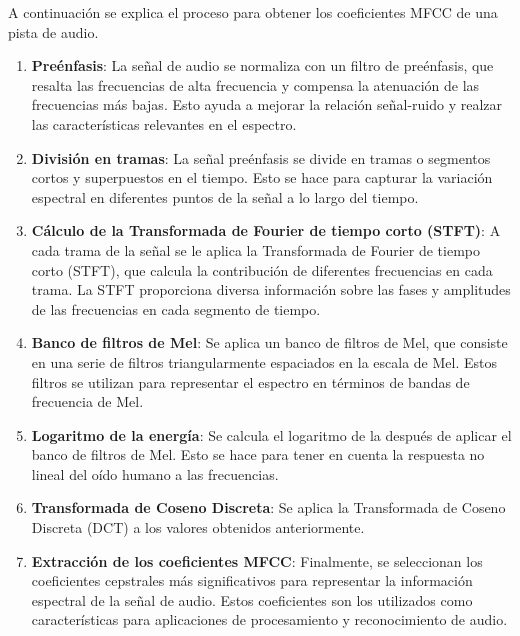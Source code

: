 A continuación se explica el proceso para obtener los coeficientes MFCC de una pista de audio.

\begin{enumerate}
\tightlist
\item \textbf{Preénfasis}: La señal de audio se normaliza con un filtro de preénfasis, que resalta las frecuencias de alta frecuencia y compensa la atenuación de las frecuencias más bajas. Esto ayuda a mejorar la relación señal-ruido y realzar las características relevantes en el espectro.

\item \textbf{División en tramas}: La señal preénfasis se divide en tramas o segmentos cortos y superpuestos en el tiempo. Esto se hace para capturar la variación espectral en diferentes puntos de la señal a lo largo del tiempo.

\item \textbf{Cálculo de la Transformada de Fourier de tiempo corto (STFT)}: A cada trama de la señal se le aplica la Transformada de Fourier de tiempo corto (STFT), que calcula la contribución de diferentes frecuencias en cada trama. La STFT proporciona diversa información sobre las fases y amplitudes de las frecuencias en cada segmento de tiempo.

\item \textbf{Banco de filtros de Mel}: Se aplica un banco de filtros de Mel, que consiste en una serie de filtros triangularmente espaciados en la escala de Mel. Estos filtros se utilizan para representar el espectro en términos de bandas de frecuencia de Mel.

\item \textbf{Logaritmo de la energía}: Se calcula el logaritmo de la después de aplicar el banco de filtros de Mel. Esto se hace para tener en cuenta la respuesta no lineal del oído humano a las frecuencias.

\item \textbf{Transformada de Coseno Discreta}: Se aplica la Transformada de Coseno Discreta (DCT) a los valores obtenidos anteriormente.

\item \textbf{Extracción de los coeficientes MFCC}: Finalmente, se seleccionan los coeficientes cepstrales más significativos para representar la información espectral de la señal de audio. Estos coeficientes son los utilizados como características para aplicaciones de procesamiento y reconocimiento de audio.
\end{enumerate}

